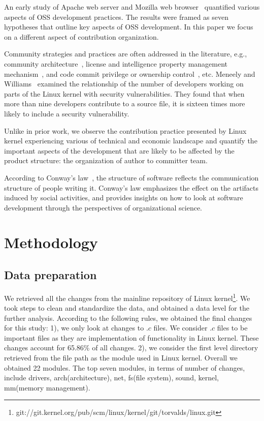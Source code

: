\documentclass{sig-alternate-05-2015}
\begin{document}
An early study of Apache web server and Mozilla web browser~\cite{MFH02}
quantified various aspects of OSS development practices. The
results were framed as seven hypotheses that outline key aspects of
OSS development.  In this paper we focus on a different aspect of
 contribution organization.

Community strategies and practices are often addressed in the
literature, e.g., community architecture~\cite{MFH02,YK03}, license
and intelligence property management mechanism~\cite{Hippel03}, and
code commit privilege or ownership control~\cite{MFH02,YK03,KSL03}, etc.
  Meneely  and  Williams~\cite{meneely09}  examined  the  relationship
of  the  number  of  developers  working  on  parts  of  the
Linux kernel with security vulnerabilities.  They found
that when more than nine developers contribute to a source
file, it is sixteen times more likely to include a security vulnerability.

Unlike in prior work, we observe the contribution practice
presented by Linux kernel experiencing various of technical and economic landscape
and quantify the important aspects of the development that are likely
to be affected by the product structure:
 the organization of author to committer team.

According to Conway's law~\cite{conway}, the structure of software reflects
the communication structure of people writing it.
Conway's law emphasizes the effect on the artifacts induced by social activities,
and provides insights on how to look at software development
through the perspectives of organizational science.

\section{Methodology}\label{s:method}
\subsection{Data preparation}
We retrieved all the changes from the mainline repository of Linux
kernel\footnote{git://git.kernel.org/pub/scm/linux/kernel/git/torvalds/linux.git}.
We took steps to clean and standardize the data, and obtained a data level for the further analysis.
According to the following rules, we obtained the final changes for this study:
1), we only look at changes to $.c$ files. We consider $.c$ files to be important files as they are implementation of functionality in Linux kernel. These changes account for 65.86\% of all changes.
2), we consider the first level directory retrieved from the file path as the module used in Linux kernel. Overall we obtained 22 modules. The top seven modules, in terms of number of changes, include drivers, arch(architecture), net, fs(file system), sound, kernel, mm(memory management).
\end{document}
